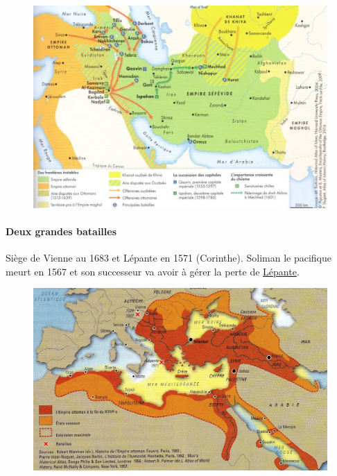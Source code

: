 \begin{figure}[h!]
    \centering
    \includegraphics[width=\textwidth]{HistoireIslamMediterranee/Images/EmpireSefevide.jpg}

    \label{fig:my_label}
\end{figure}

\paragraph{Deux grandes batailles} Siège de Vienne au 1683 et Lépante en 1571 (Corinthe). Soliman le pacifique meurt en 1567 et son successeur va avoir à gérer la perte de \href{https://fr.wikipedia.org/wiki/Bataille_de_L%C3%A9pante}{Lépante}.
\begin{figure}[h!]
    \centering
    \includegraphics[width=\textwidth]{HistoireIslamMediterranee/Images/EmpireOttomanXVIIe.jpg}

    \label{fig:my_label}
\end{figure}
